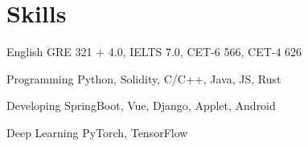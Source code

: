 \documentclass[12pt,letterpaper]{report}
\begin{document}
    \section*{Skills}
    \begin{tablist}
        \item[English] \tab{}\tab{}GRE 321 + 4.0, IELTS 7.0, CET-6 566, CET-4 626
        \item[Programming] \tab{}Python, Solidity, C/C++, Java, JS, Rust
        \item[Developing] \tab{}SpringBoot, Vue, Django, Applet, Android
        \item[Deep Learning] \tab{}PyTorch, TensorFlow
    \end{tablist}
\end{document}
